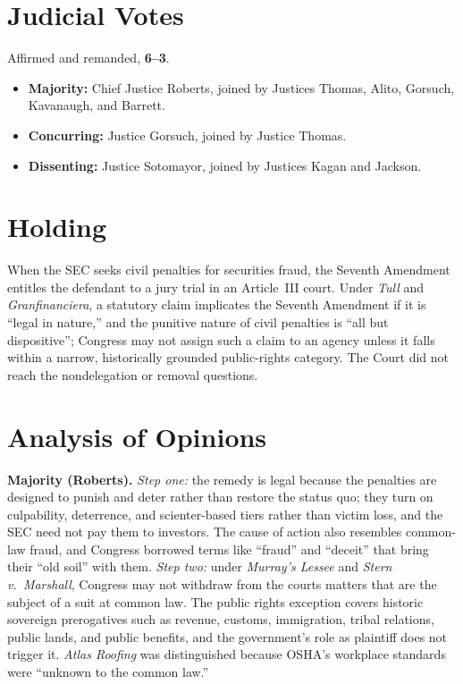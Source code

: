 \documentclass[12pt]{article}
\begin{document}
\section{Judicial Votes}

Affirmed and remanded, \textbf{6--3}.
\begin{itemize}
\item \textbf{Majority:} Chief Justice Roberts, joined by Justices Thomas, Alito, Gorsuch, Kavanaugh, and Barrett.
\item \textbf{Concurring:} Justice Gorsuch, joined by Justice Thomas.
\item \textbf{Dissenting:} Justice Sotomayor, joined by Justices Kagan and Jackson.
\end{itemize}

\section{Holding}

When the SEC seeks civil penalties for securities fraud, the Seventh Amendment entitles the defendant to a jury trial in an Article~III court. Under \textit{Tull} and \textit{Granfinanciera}, a statutory claim implicates the Seventh Amendment if it is ``legal in nature,'' and the punitive nature of civil penalties is ``all but dispositive''; Congress may not assign such a claim to an agency unless it falls within a narrow, historically grounded public-rights category. The Court did not reach the nondelegation or removal questions.

\section{Analysis of Opinions}

\textbf{Majority (Roberts).} \emph{Step one:} the remedy is legal because the penalties are designed to punish and deter rather than restore the status quo; they turn on culpability, deterrence, and scienter-based tiers rather than victim loss, and the SEC need not pay them to investors. The cause of action also resembles common-law fraud, and Congress borrowed terms like ``fraud'' and ``deceit'' that bring their ``old soil'' with them. \emph{Step two:} under \textit{Murray's Lessee} and \textit{Stern v.\ Marshall}, Congress may not withdraw from the courts matters that are the subject of a suit at common law. The public rights exception covers historic sovereign prerogatives such as revenue, customs, immigration, tribal relations, public lands, and public benefits, and the government's role as plaintiff does not trigger it. \textit{Atlas Roofing} was distinguished because OSHA's workplace standards were ``unknown to the common law.''
\end{document}
